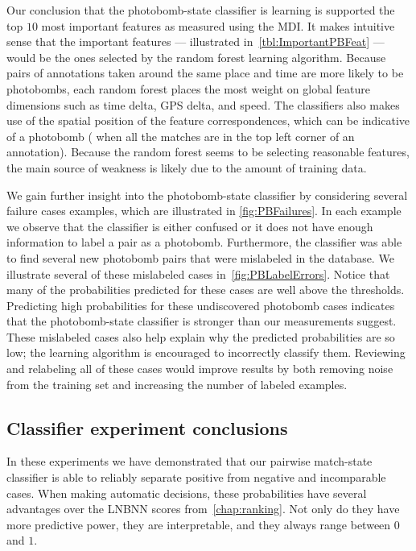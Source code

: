         Our conclusion that the photobomb-state classifier is learning is supported the top $10$ most important
          features as measured using the MDI.
        It makes intuitive sense that the important features --- illustrated in~\cref{tbl:ImportantPBFeat} ---
          would be the ones selected by the random forest learning algorithm.
        Because pairs of annotations taken around the same place and time are more likely to be photobombs, each
          random forest places the most weight on global feature dimensions such as time delta, GPS delta, and
          speed.
        The classifiers also makes use of the spatial position of the feature correspondences, which can be
          indicative of a photobomb (\eg{} when all the matches are in the top left corner of an annotation).
        Because the random forest seems to be selecting reasonable features, the main source of weakness is
          likely due to the amount of training data.

        \ImportantPBFeat{}

        We gain further insight into the photobomb-state classifier by considering several failure cases
          examples, which are illustrated in \cref{fig:PBFailures}.
        In each example we observe that the classifier is either confused or it does not have enough information
          to label a pair as a photobomb.
        Furthermore, the classifier was able to find several new photobomb pairs that were mislabeled in the
          database.
        We illustrate several of these mislabeled cases in~\cref{fig:PBLabelErrors}.
        Notice that many of the probabilities predicted for these cases are well above the thresholds.
        Predicting high probabilities for these undiscovered photobomb cases indicates that the photobomb-state
          classifier is stronger than our measurements suggest.
        These mislabeled \groundtruth{} cases also help explain why the predicted probabilities are so low; the
          learning algorithm is encouraged to incorrectly classify them.
        Reviewing and relabeling all of these cases would improve results by both removing noise from the
          training set and increasing the number of labeled examples.

        \PBFailures{}

        \PBLabelErrors{}

    \FloatBarrier{}
    \subsection{Classifier experiment conclusions}
        In these experiments we have demonstrated that our pairwise match-state classifier is able to reliably
          separate positive from negative and incomparable cases.
        When making automatic decisions, these probabilities have several advantages over the LNBNN scores
          from~\cref{chap:ranking}.
        Not only do they have more predictive power, they are interpretable, and they always range between $0$
          and $1$.

